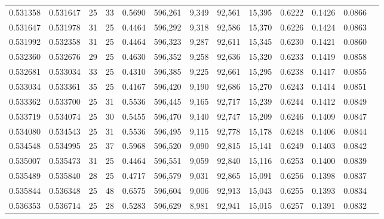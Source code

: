 \begin{tabular}{rrrrrrrrrrrrr}
0.531358 & 0.531647 &    25 &  33 &                                     0.5690 & 596,261 &   9,349 &  92,561 &  15,395 & 0.6222 & 0.1426 & 0.0866 \\
0.531647 & 0.531978 &    31 &  25 &                                     0.4464 & 596,292 &   9,318 &  92,586 &  15,370 & 0.6226 & 0.1424 & 0.0863 \\
0.531992 & 0.532358 &    31 &  25 &                                     0.4464 & 596,323 &   9,287 &  92,611 &  15,345 & 0.6230 & 0.1421 & 0.0860 \\
0.532360 & 0.532676 &    29 &  25 &                                     0.4630 & 596,352 &   9,258 &  92,636 &  15,320 & 0.6233 & 0.1419 & 0.0858 \\
0.532681 & 0.533034 &    33 &  25 &                                     0.4310 & 596,385 &   9,225 &  92,661 &  15,295 & 0.6238 & 0.1417 & 0.0855 \\
0.533034 & 0.533361 &    35 &  25 &                                     0.4167 & 596,420 &   9,190 &  92,686 &  15,270 & 0.6243 & 0.1414 & 0.0851 \\
0.533362 & 0.533700 &    25 &  31 &                                     0.5536 & 596,445 &   9,165 &  92,717 &  15,239 & 0.6244 & 0.1412 & 0.0849 \\
0.533719 & 0.534074 &    25 &  30 &                                     0.5455 & 596,470 &   9,140 &  92,747 &  15,209 & 0.6246 & 0.1409 & 0.0847 \\
0.534080 & 0.534543 &    25 &  31 &                                     0.5536 & 596,495 &   9,115 &  92,778 &  15,178 & 0.6248 & 0.1406 & 0.0844 \\
0.534548 & 0.534995 &    25 &  37 &                                     0.5968 & 596,520 &   9,090 &  92,815 &  15,141 & 0.6249 & 0.1403 & 0.0842 \\
0.535007 & 0.535473 &    31 &  25 &                                     0.4464 & 596,551 &   9,059 &  92,840 &  15,116 & 0.6253 & 0.1400 & 0.0839 \\
0.535489 & 0.535840 &    28 &  25 &                                     0.4717 & 596,579 &   9,031 &  92,865 &  15,091 & 0.6256 & 0.1398 & 0.0837 \\
0.535844 & 0.536348 &    25 &  48 &                                     0.6575 & 596,604 &   9,006 &  92,913 &  15,043 & 0.6255 & 0.1393 & 0.0834 \\
0.536353 & 0.536714 &    25 &  28 &                                     0.5283 & 596,629 &   8,981 &  92,941 &  15,015 & 0.6257 & 0.1391 & 0.0832 \\

\end{tabular}
